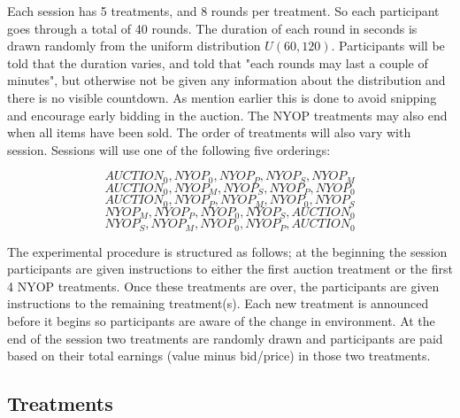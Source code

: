 \documentclass[a4paper,12pt]{article}
\begin{document}
	Each session has 5 treatments, and 8 rounds per treatment. So each participant goes through a total of 40 rounds. The duration of each round in seconds is drawn randomly from the uniform distribution $U(60, 120)$. Participants will be told that the duration varies, and told that "each rounds may last a couple of minutes", but otherwise not be given any information about the distribution and there is no visible countdown. As mention earlier this is done to avoid snipping and encourage early bidding in the auction. The NYOP treatments may also end when all items have been sold. The order of treatments will also vary with session. Sessions will use one of the following five orderings:

\[	{AUCTION_0, NYOP_0, NYOP_P, NYOP_S, NYOP_M} \]
\[	{AUCTION_0, NYOP_M, NYOP_S, NYOP_P, NYOP_0} \]
\[	{AUCTION_0, NYOP_P, NYOP_M, NYOP_0, NYOP_S} \]
\[	{NYOP_M, NYOP_P, NYOP_0, NYOP_S, AUCTION_0} \]
\[	{NYOP_S, NYOP_M, NYOP_0, NYOP_P, AUCTION_0} \]
	
	The experimental procedure is structured as follows; at the beginning the session participants are given instructions to either the first auction treatment or the first 4 NYOP treatments. Once these treatments are over, the participants are given instructions to the remaining treatment(s). Each new treatment is announced before it begins so participants are aware of the change in environment. At the end of the session two treatments are randomly drawn and participants are paid based on their total earnings (value minus bid/price) in those two treatments.

	\subsection{Treatments}
\end{document}
